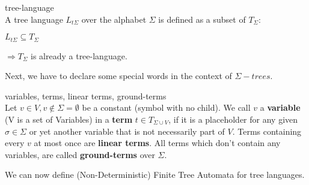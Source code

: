 \documentclass{llncs}
\begin{document}
\begin{definition}{tree-language \cite{automata-xml}}
	\\
	A tree language \(L_{t\Sigma}\) over the alphabet \(\Sigma\) is defined as a subset of \(T_\Sigma\):
	\begin{center}
		\(L_{t\Sigma} \subseteq T_\Sigma\)
	\end{center}
	\(\Rightarrow T_\Sigma\) is already a tree-language.	
\end{definition}

Next, we have to declare some special words in the context of $\Sigma-trees$.

\begin{definition}{variables, terms, linear terms, ground-terms} \cite{tata-nfta}\cite{wiki-groundterm}\\
	Let \(v \in V, v \notin \Sigma = \emptyset\) be a constant (symbol with no child). We call $v$ a \textbf{variable} (V is a set of Variables) in a \textbf{term} \(t \in T_{\Sigma \cup V}\), if it is a placeholder
	for any given \(\sigma \in \Sigma\) or yet another variable that is not necessarily part of \(V\). Terms containing every $v$ at most once are \textbf{linear terms}. All terms which don't contain any variables, are called \textbf{ground-terms} over \(\Sigma\).\\
\end{definition}

\pagebreak
We can now define (Non-Deterministic) Finite Tree Automata for tree languages.
\end{document}
